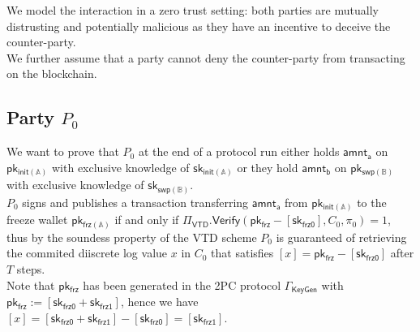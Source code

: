 \documentclass{article}      	%
\begin{document}
We model the interaction in a zero trust setting: both parties are mutually distrusting and potentially malicious as they have an incentive to deceive the counter-party. \\
We further assume that a party cannot deny the counter-party from transacting on the blockchain.


\subsection{Party $P_0$}
We want to prove that $P_0$ at the end of a protocol run either holds $\mathsf{amnt_a}$ on $\mathsf{pk_{init(\mathbb{A})}}$ with exclusive knowledge of $\mathsf{sk_{init(\mathbb{A})}}$ or they hold $\mathsf{amnt_b}$ on $\mathsf{pk_{swp(\mathbb{B})}}$ with exclusive knowledge of $\mathsf{sk_{swp(\mathbb{B})}}$. \\


$P_0$ signs and publishes a transaction transferring $\mathsf{amnt_a}$ from $\mathsf{pk_{init(\mathbb{A})}}$ to the freeze wallet $\mathsf{pk_{frz(\mathbb{A})}}$ if and only if $\Pi_{\mathsf{VTD}}.\mathsf{Verify}(\mathsf{pk_{frz}} - [\mathsf{sk_{frz0}}], C_0, \pi_0) = 1$, thus by the soundess property of the VTD scheme $P_0$ is guaranteed of retrieving the commited diiscrete log value $x$ in $C_0$ that satisfies $[x] =  \mathsf{pk_{frz}} - [\mathsf{sk_{frz0}}]$ after $T$ steps. \\
Note that $\mathsf{pk_{frz}}$ has been generated in the 2PC protocol $\Gamma_{\mathsf{KeyGen}}$ with $\mathsf{pk_{frz}} := [\mathsf{sk_{frz0}} + \mathsf{sk_{frz1}}]$, hence we have $[x] = [\mathsf{sk_{frz0}} + \mathsf{sk_{frz1}}] - [\mathsf{sk_{frz0}}] = [\mathsf{sk_{frz1}}]$. \\
\end{document}
